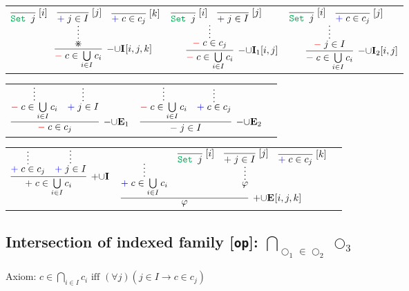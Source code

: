 \documentclass[11pt]{article}
\begin{document}
\noindent
\begin{tabular}{ccc}
$
\infer[\DenyRule{\cup}\Intro{}{[i,j,k]}]{\Deny{c\in \bigcup\limits_{i\in I}c_i}}{
    \infer*{\divideontimes}{
    	\infer[\Label{i}]{\Set{j}}{}
    	&
    	\infer[\Label{j}]{\Assert{j\in I}}{}
    	&
    	\infer[\Label{k}]{\Assert{c\in c_j}}{}
    }
}
$
\hspace{0.5cm}
&
$
\infer[\DenyRule{\cup}\Intro{1}{[i,j]}]{\Deny{c\in \bigcup\limits_{i\in I}c_i}}{
    \infer*{\Deny{c\in c_j}}{
    	\infer[\Label{i}]{\Set{j}}{}
    	&
    	\infer[\Label{j}]{\Assert{j\in I}}{}
    }
}
$
\hspace{0.5cm}
&
$
\infer[\DenyRule{\cup}\Intro{2}{[i,j]}]{\Deny{c\in \bigcup\limits_{i\in I}c_i}}{
    \infer*{\Deny{j\in I}}{
    	\infer[\Label{i}]{\Set{j}}{}
    	&
    	\infer[\Label{j}]{\Assert{c\in c_j}}{}
    }
}
$
\end{tabular}

\bigskip
\noindent

\begin{tabular}{ccc}
$
\infer[\DenyRule{\cup}\Elim{1}]{\Deny{c\in c_j}}{
	\infer*{\Deny{c\in \bigcup\limits_{i\in I}c_i}}{} 
	& 
	\infer*{\Assert{j\in I}}{}
}
$
\hspace{1cm}
&
$
\infer[\DenyRule{\cup}\Elim{2}]{\Deny{j\in I}}{
	\infer*{\Deny{c\in \bigcup\limits_{i\in I}c_i}}{} 
	& 
	\infer*{\Assert{c\in c_j}}{}
}
$
\end{tabular}

\bigskip
\noindent
\begin{tabular}{ccc}
$
\infer[\AssertRule{\cup}\Intro{}]{\Assert{c\in \bigcup\limits_{i\in I}c_i}}{
	\infer*{\Assert{c\in c_j}}{}
	& 
	\infer*{\Assert{j\in I}}{}
}
$
\hspace{1cm}
&
$
\infer[\AssertRule{\cup}\Elim{}{[i,j,k]}]{\varphi}{
	\infer*{\Assert{c\in \bigcup\limits_{i\in I}c_i}}{}
	&
	\infer*{\varphi}{
		\infer[\Label{i}]{\Set{j}}{}
		&
		\infer[\Label{j}]{\Assert{j\in I}}{}
		&
		\infer[\Label{k}]{\Assert{c\in c_j}}{}
	}
}
$
\end{tabular}
\bigskip


\subsection*{Intersection of indexed family [\texttt{op}]: $\bigcap\limits_{\bigcirc_1\in \bigcirc_2}\bigcirc_3$}

\smallskip
\noindent
Axiom: $c \in \bigcap\limits_{i\in I}c_i\text{ iff }
(\forall j) (j\in I \to c\in c_j)$
\smallskip
\end{document}
